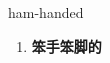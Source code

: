 
\begin{frame}
{\huge ham-handed}
\begin{center}
\begin{enumerate}\Large
  \item \textbf{笨手笨脚的}
\end{enumerate}
\end{center}
\end{frame}

